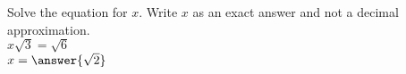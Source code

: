 \documentclass{ximera}
\author{David Kish}
\begin{document}
\begin{exercise}
Solve the equation for $x$. Write $x$ as an exact answer and not a decimal approximation.\\
$x\sqrt{3} = \sqrt{6}$\\
$x=\answer{\sqrt{2}}$
\end{exercise}
\end{document}
